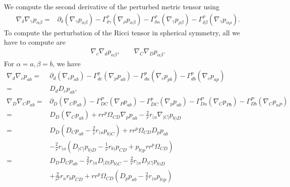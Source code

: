 \documentclass[12pt]{report}
\begin{document}
We compute the second derivative of the perturbed metric tensor using
\begin{align}
    \nabla_{\delta}\nabla_{\gamma}p_{\alpha\beta}
    =&
    \partial_{\delta}\left(\nabla_{\gamma}p_{\alpha\beta}\right)
    -
    \Gamma^{\rho}_{\delta\gamma}\left(\nabla_{\rho}p_{\alpha\beta}\right)
    -
    \Gamma^{\rho}_{\delta\alpha}\left(\nabla_{\gamma}p_{\rho\beta}\right)
    -
    \Gamma^{\rho}_{\delta\beta}\left(\nabla_{\gamma}p_{\alpha\rho}\right)
    .
\end{align}
To compute the perturbation of the Ricci tensor in spherical symmetry,
all we have to compute are
\begin{align}
    \nabla_c\nabla_d p_{\alpha\beta}
    ,\qquad
    \nabla_C\nabla_D p_{\alpha\beta}
    .
\end{align}
For $\alpha=a,\beta=b$, we have
\begin{subequations}
\label{eq:scd_der_metric_pert_ab}
\begin{align}
    \nabla_d\nabla_cp_{ab}
    =&
    \partial_{d}\left(\nabla_{c}p_{ab}\right)
    -
    \Gamma^{p}_{dc}\left(\nabla_{p}p_{ab}\right)
    -
    \Gamma^{p}_{da}\left(\nabla_{c}p_{pb}\right)
    -
    \Gamma^{p}_{db}\left(\nabla_{c}p_{ap}\right)
    \nonumber\\
    =&
    D_dD_cp_{ab}
    ,\\
    \nabla_D\nabla_Cp_{ab}
    =&
    \partial_{D}\left(\nabla_{C}p_{ab}\right)
    -
    \Gamma^{P}_{DC}\left(\nabla_{P}p_{ab}\right)
    -
    \Gamma^{p}_{DC}\left(\nabla_{p}p_{ab}\right)
    -
    \Gamma^{P}_{Da}\left(\nabla_{C}p_{Pb}\right)
    -
    \Gamma^{P}_{Db}\left(\nabla_{C}p_{aP}\right)
    \nonumber\\
    =&
    D_D\left(\nabla_Cp_{ab}\right)
    +
    r r^p\Omega_{CD} \nabla_pp_{ab}
    -
    \frac{2}{r}r_{(a}\nabla_{|C|}p_{b)D}
    \nonumber\\
    =&
    D_D\left(
        D_Cp_{ab}
        -
        \frac{2}{r}r_{(a}p_{b)C}
    \right)
    +
    r r^p\Omega_{CD} D_pp_{ab}
    \nonumber\\
    &
    -
    \frac{2}{r}r_{(a}\left(
        D_{|C|}p_{b)D}
        -
        \frac{1}{r}r_{b)}p_{CD}
        +
        p_{b)p}rr^p\Omega_{CD}
    \right)
    \nonumber\\
    =&
    D_DD_Cp_{ab}
    -
    \frac{2}{r}r_{(a}D_{|D|}p_{b)C}
    -
    \frac{2}{r}r_{(a}D_{|C|}p_{b)D}
    \nonumber\\
    &
    +
    \frac{2}{r^2}r_{a}r_{b}p_{CD}
    +
    rr^p\Omega_{CD}
    \left(
        D_pp_{ab}
        -
        \frac{2}{r}r_{(a}p_{b)p}
    \right)
\end{align}
\end{subequations}
\end{document}
